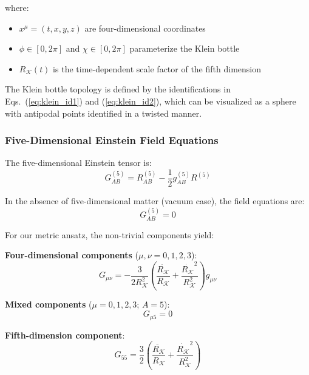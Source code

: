 \documentclass[reprint,amsmath,amssymb,aps,prd]{revtex4-2}
\newcommand{\Klein}{\mathcal{K}}
\newcommand{\KleinRadius}{R_\Klein}
\begin{document}
where:
\begin{itemize}
\item $x^\mu = (t, x, y, z)$ are four-dimensional coordinates
\item $\phi \in [0, 2\pi]$ and $\chi \in [0, 2\pi]$ parameterize the Klein bottle
\item $\KleinRadius(t)$ is the time-dependent scale factor of the fifth dimension
\end{itemize}

The Klein bottle topology is defined by the identifications in Eqs.~(\ref{eq:klein_id1}) and (\ref{eq:klein_id2}), which can be visualized as a sphere with antipodal points identified in a twisted manner.

\subsubsection{Five-Dimensional Einstein Field Equations}

The five-dimensional Einstein tensor is:
\begin{equation}
G^{(5)}_{AB} = R^{(5)}_{AB} - \frac{1}{2} g^{(5)}_{AB} R^{(5)}
\label{eq:5d_einstein_tensor}
\end{equation}

In the absence of five-dimensional matter (vacuum case), the field equations are:
\begin{equation}
G^{(5)}_{AB} = 0
\label{eq:5d_field_equations}
\end{equation}

For our metric ansatz, the non-trivial components yield:

\textbf{Four-dimensional components} ($\mu, \nu = 0,1,2,3$):
\begin{equation}
G_{\mu\nu} = -\frac{3}{2\KleinRadius^2}\left(\frac{\ddot{\KleinRadius}}{\KleinRadius} + \frac{\dot{\KleinRadius}^2}{\KleinRadius^2}\right) g_{\mu\nu}
\label{eq:4d_components}
\end{equation}

\textbf{Mixed components} ($\mu = 0,1,2,3$; $A = 5$):
\begin{equation}
G_{\mu 5} = 0
\label{eq:mixed_components}
\end{equation}

\textbf{Fifth-dimension component}:
\begin{equation}
G_{55} = \frac{3}{2}\left(\frac{\ddot{\KleinRadius}}{\KleinRadius} + \frac{\dot{\KleinRadius}^2}{\KleinRadius^2}\right)
\label{eq:5d_component}
\end{equation}
\end{document}
